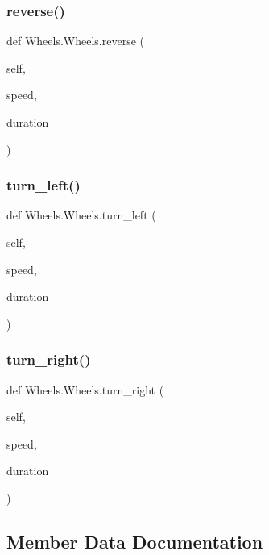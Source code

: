 \subsubsection{\texorpdfstring{reverse()}{reverse()}}
{\footnotesize\ttfamily def Wheels.\+Wheels.\+reverse (\begin{DoxyParamCaption}\item[{}]{self,  }\item[{}]{speed,  }\item[{}]{duration }\end{DoxyParamCaption})}

\mbox{\label{class_wheels_1_1_wheels_a71354795014dc6c28125b1c86666b8b4}} 
\subsubsection{\texorpdfstring{turn\+\_\+left()}{turn\_left()}}
{\footnotesize\ttfamily def Wheels.\+Wheels.\+turn\+\_\+left (\begin{DoxyParamCaption}\item[{}]{self,  }\item[{}]{speed,  }\item[{}]{duration }\end{DoxyParamCaption})}

\mbox{\label{class_wheels_1_1_wheels_a325e09d58c40e88dbe2d1fda1295b26f}} 
\subsubsection{\texorpdfstring{turn\+\_\+right()}{turn\_right()}}
{\footnotesize\ttfamily def Wheels.\+Wheels.\+turn\+\_\+right (\begin{DoxyParamCaption}\item[{}]{self,  }\item[{}]{speed,  }\item[{}]{duration }\end{DoxyParamCaption})}



\subsection{Member Data Documentation}
\mbox{\label{class_wheels_1_1_wheels_a47e8526b08d3a33a7c03524bde27b659}} 
